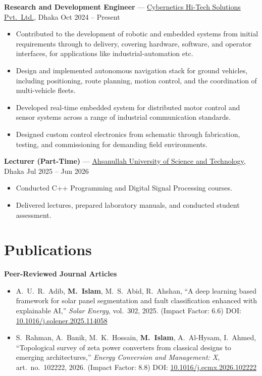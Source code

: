\documentclass[10pt]{article}
\newcommand{\me}{\textbf{M.\ Islam}}
\begin{document}
\textbf{Research and Development Engineer} ---
\href{https://cyberneticsbd.com/}{Cybernetics Hi-Tech Solutions Pvt.\ Ltd.}, Dhaka
\hfill Oct 2024 -- Present
\begin{itemize}
    \item Contributed to the development of robotic and embedded systems from initial requirements
    through to delivery, covering hardware, software, and operator interfaces, for applications like industrial-automation etc.
    \item Design and implemented autonomous navigation stack for ground vehicles, including
    positioning, route planning, motion control, and the coordination of multi-vehicle fleets.
    \item Developed real-time embedded system for distributed motor control and sensor systems
    across a range of industrial communication standards.
    \item Designed custom control electronics from schematic through fabrication, testing, and
    commissioning for demanding field environments.
\end{itemize}

\textbf{Lecturer (Part-Time)} ---
\href{https://www.aust.edu/}{Ahsanullah University of Science and Technology}, Dhaka
\hfill Jul 2025 -- Jun 2026
\begin{itemize}
    \item Conducted C++ Programming and Digital Signal Processing courses.
    \item Delivered lectures, prepared laboratory manuals, and conducted student assessment.
\end{itemize}

\section*{Publications}

\textbf{Peer-Reviewed Journal Articles}
\begin{itemize}
    \item A.\ U.\ R.\ Adib, \me, M.\ S.\ Abid, R.\ Ahshan, ``A deep learning based framework for
    solar panel segmentation and fault classification enhanced with explainable AI,''
    \textit{Solar Energy}, vol.\ 302, 2025. (Impact Factor: 6.6)
    DOI: \href{https://doi.org/10.1016/j.solener.2025.114058}{10.1016/j.solener.2025.114058}
    \item S.\ Rahman, A.\ Banik, M.\ K.\ Hossain, \me, A.\ Al-Hysam, I.\ Ahmed, ``Topological survey
    of zeta power converters from classical designs to emerging architectures,''
    \textit{Energy Conversion and Management: X}, art.\ no.\ 102222, 2026. (Impact Factor: 8.8)
    DOI: \href{https://doi.org/10.1016/j.ecmx.2026.102222}{10.1016/j.ecmx.2026.102222}
\end{itemize}
\end{document}

